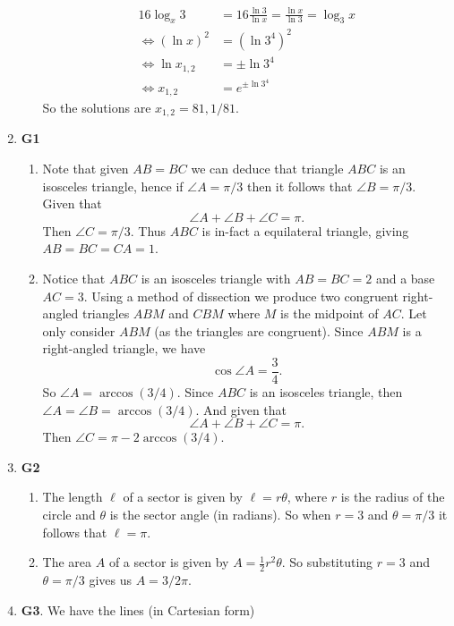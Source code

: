 \documentclass[12pt,oneside]{book}
\begin{document}
\begin{enumerate}
\begin{enumerate}
\begin{align*}
                16 \log_x 3 &= 16 \frac{\ln 3}{\ln x} = \frac{\ln x}{\ln 3} = \log_3 x \\
                \iff (\ln x)^2 &= (\ln 3^4)^2 \\
                \iff \ln x_{1,2} &= \pm \ln 3^4 \\
                \iff x_{1,2} &= e^{\pm \ln 3^4}
            \end{align*}
            So the solutions are $x_{1,2} = 81, 1/81$.
        \end{enumerate}
        \item \textbf{G1} \begin{enumerate}
            \item Note that given $AB = BC$ we can deduce that triangle $ABC$ is an isosceles triangle, hence if $\angle A = \pi/3$ then it follows that $\angle B = \pi/3$. Given that \[
                \angle A + \angle B + \angle C = \pi
            .\] Then $\angle C = \pi/3$. Thus $ABC$ is in-fact a equilateral triangle, giving $AB = BC = CA = 1$.
            \item Notice that $ABC$ is an isosceles triangle with $AB = BC = 2$ and a base $AC = 3$. Using a method of dissection we produce two congruent right-angled triangles $ABM$ and $CBM$ where $M$ is the midpoint of $AC$. Let only consider $ABM$ (as the triangles are congruent). Since $ABM$ is a right-angled triangle, we have \[
                \cos \angle A = \frac{3}{4}
            .\]  So $\angle A = \arccos(3/4)$. Since $ABC$ is an isosceles triangle, then $\angle A = \angle B = \arccos(3/4)$. And given that \[
                \angle A + \angle B + \angle C = \pi
            .\] Then $\angle C = \pi - 2\arccos(3/4)$.
        \end{enumerate}
        \item \textbf{G2} \begin{enumerate}
            \item The length $\ell$ of a sector is given by $\ell = r\theta$, where $r$ is the radius of the circle and $\theta$ is the sector angle (in radians). So when $r = 3$ and $\theta = \pi/3$ it follows that $\ell = \pi$.
            \item The area $A$ of a sector is given by $A = \frac{1}{2} r^2 \theta$. So substituting $r= 3$ and $\theta = \pi/3$ gives us $A = 3/2 \pi$.
        \end{enumerate}
        \item \textbf{G3}. We have the lines (in Cartesian form) \begin{align*}

\end{align*}
\end{enumerate}
\end{document}
